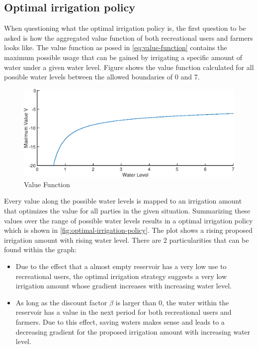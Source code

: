 \documentclass[12pt, a4paper, oneside]{article}
\begin{document}
\subsection{Optimal irrigation policy}
When questioning what the optimal irrigation policy is, the first question to be asked is how the aggregated value function of both recreational users and farmers looks like.
The value function as posed in \ref{eq:value-function} contains the maximum possible usage that can be gained by irrigating a specific amount of water under a given water level. 
Figure  shows the value function calculated for all possible water levels between the allowed boundaries of 0 and 7. 
\begin{figure}[ht]
	\includegraphics[width=1\textwidth]{figures/value_function.eps}
	\caption{Value Function}
	\label{fig:value-function}
\end{figure}
\newline
Every value along the possible water levels is mapped to an irrigation amount that optimizes the value for all parties in the given situation. Summarizing these values over the range of possible water levels results in a optimal irrigation policy which is shown in \ref{fig:optimal-irrigation-policy}.
The plot shows a rising proposed irrigation amount with rising water level. There are 2 particularities that can be found within the graph:
\begin{itemize}
	\item Due to the effect that a almost empty reservoir has a very low use to recreational users, the optimal irrigation strategy suggests a very low irrigation amount whose gradient increases with increasing water level.
	\item As long as the discount factor $\beta$ is larger than 0, the water within the reservoir has a value in the next period for both recreational users and farmers. Due to this effect, saving waters makes sense and leads to a decreasing gradient for the proposed irrigation amount with increasing water level.
\end{itemize}
\end{document}
